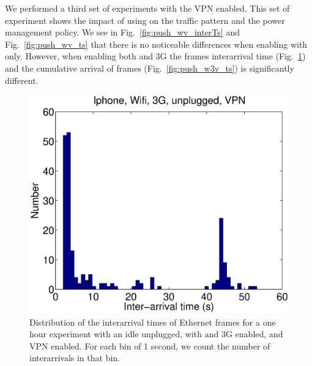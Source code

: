 We performed a third set of experiments with the VPN enabled. This set
of experiment shows the impact of using \meddle on the traffic pattern
and the power management policy. We see in
Fig.~\ref{fig:push_wv_interTs} and Fig.~\ref{fig:push_wv_ts} that
there is no noticeable differences when enabling \meddle with \wifi{} only. However,
when enabling both \wifi and 3G the frames interarrival time
(Fig.~\ref{fig:push_w3v_interTs}) and the cumulative arrival of frames
(Fig.~\ref{fig:push_w3v_ts}) is significantly different. 





\begin{figure}
\centering
        \includegraphics[width=0.8\linewidth]{../../code/pushNotification/Fig/bw_iphone_wifi_3g_unplug_vpn_interTs.eps}
  \caption{Distribution of the interarrival times of Ethernet frames
    for a one hour experiment with an idle \iphone{} unplugged, with \wifi{} and 3G
    enabled, and VPN enabled. For each bin of 1 second, we count
    the number of interarrivals in that bin.}
  \label{fig:push_w3v_interTs}
\end{figure}


